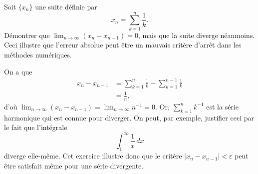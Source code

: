 \begin{exercice}
  Soit $\{x_n\}$ une suite définie par
  \begin{displaymath}
    x_n = \sum_{k=1}^n \frac{1}{k}.
  \end{displaymath}
  Démontrer que $\lim_{n \rightarrow \infty} (x_n - x_{n-1}) = 0$,
  mais que la suite diverge néanmoins. Ceci illustre que l'erreur
  absolue peut être un mauvais critère d'arrêt dans les méthodes
  numériques.
  \begin{sol}
    On a que
    \begin{align*}
      x_n - x_{n - 1}
      &= \sum_{k=1}^n \frac{1}{k} - \sum_{k=1}^{n - 1} \frac{1}{k} \\
      &= \frac{1}{n},
    \end{align*}
    d'où $\lim_{n \rightarrow \infty} (x_n - x_{n-1}) = \lim_{n
      \rightarrow \infty} n^{-1} = 0$. Or, $\sum_{k=1}^n k^{-1}$ est
    la série harmonique qui est connue pour diverger. On peut, par
    exemple, justifier ceci par le fait que l'intégrale
    \begin{displaymath}
      \int_1^\infty \frac{1}{x}\, dx
    \end{displaymath}
    diverge elle-même. Cet exercice illustre donc que le critère $|x_n
    - x_{n - 1}| < \varepsilon$ peut être satisfait même pour une
    série divergente.
  \end{sol}
\end{exercice}

\newpage


